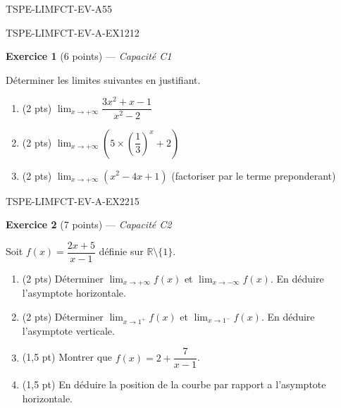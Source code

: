 \begin{evaluation}{TSPE-LIMFCT-EV-A}{55}


\begin{exercice}{TSPE-LIMFCT-EV-A-EX1}{2}{12}

\textbf{Exercice 1} (6 points) — \textit{Capacité C1}

\medskip

Déterminer les limites suivantes en justifiant.

\begin{enumerate}
  \item (2 pts) $\lim_{x \to +\infty} \dfrac{3x^2 + x - 1}{x^2 - 2}$
  \item (2 pts) $\lim_{x \to +\infty} \left(5 \times \left(\dfrac{1}{3}\right)^x + 2\right)$
  \item (2 pts) $\lim_{x \to +\infty} (x^2 - 4x + 1)$ (factoriser par le terme preponderant)
\end{enumerate}

\end{exercice}


\begin{exercice}{TSPE-LIMFCT-EV-A-EX2}{2}{15}

\textbf{Exercice 2} (7 points) — \textit{Capacité C2}

\medskip

Soit $f(x) = \dfrac{2x + 5}{x - 1}$ définie sur $\mathbb{R} \setminus \{1\}$.

\begin{enumerate}
  \item (2 pts) Déterminer $\lim_{x \to +\infty} f(x)$ et $\lim_{x \to -\infty} f(x)$. En déduire l'asymptote horizontale.
  \item (2 pts) Déterminer $\lim_{x \to 1^+} f(x)$ et $\lim_{x \to 1^-} f(x)$. En déduire l'asymptote verticale.
  \item (1,5 pt) Montrer que $f(x) = 2 + \dfrac{7}{x-1}$.
  \item (1,5 pt) En déduire la position de la courbe par rapport a l'asymptote horizontale.
\end{enumerate}


\end{exercice}
\end{evaluation}
